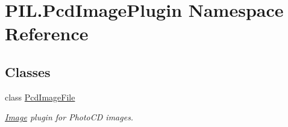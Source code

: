 \hypertarget{namespacePIL_1_1PcdImagePlugin}{}\section{P\+I\+L.\+Pcd\+Image\+Plugin Namespace Reference}
\label{namespacePIL_1_1PcdImagePlugin}
\subsection*{Classes}
\begin{DoxyCompactItemize}
\item 
class \hyperlink{classPIL_1_1PcdImagePlugin_1_1PcdImageFile}{Pcd\+Image\+File}
\begin{DoxyCompactList}\small\item\em \hyperlink{namespacePIL_1_1Image}{Image} plugin for Photo\+CD images. \end{DoxyCompactList}\end{DoxyCompactItemize}
